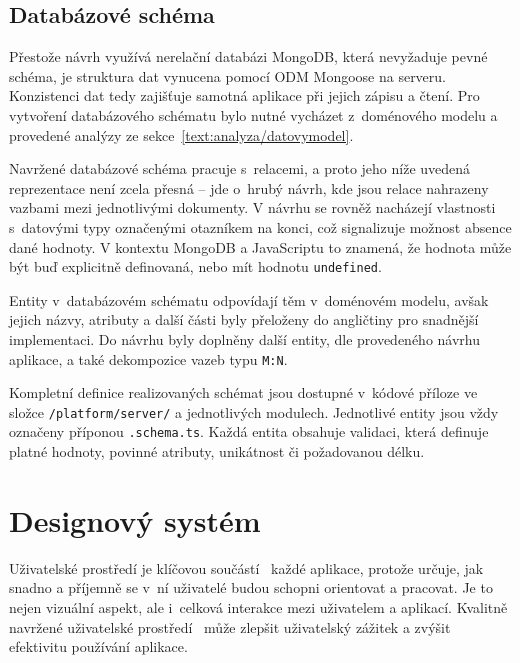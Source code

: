 \subsection{Databázové schéma}

Přestože návrh využívá nerelační databázi MongoDB, která nevyžaduje pevné schéma, je struktura dat vynucena pomocí ODM Mongoose na serveru.
Konzistenci dat tedy zajišťuje samotná aplikace při jejich zápisu a čtení. 
Pro vytvoření databázového schématu bylo nutné vycházet z~doménového modelu a provedené analýzy ze sekce~\ref{text:analyza/datovymodel}.

Navržené databázové schéma pracuje s~relacemi, a proto jeho níže uvedená reprezentace není zcela přesná -- jde o~hrubý návrh, kde jsou relace nahrazeny vazbami mezi jednotlivými dokumenty. 
V návrhu se rovněž nacházejí vlastnosti s~datovými typy označenými otazníkem na konci, což signalizuje možnost absence dané hodnoty.
V kontextu MongoDB a JavaScriptu to znamená, že hodnota může být buď explicitně definovaná, nebo mít hodnotu \texttt{undefined}.

Entity v~databázovém schématu odpovídají těm v~doménovém modelu, avšak jejich názvy, atributy a další části byly přeloženy do angličtiny pro snadnější implementaci. 
Do návrhu byly doplněny další entity, dle provedeného návrhu aplikace, a také dekompozice vazeb typu \texttt{M:N}. 

Kompletní definice realizovaných schémat jsou dostupné v~kódové příloze ve složce \verb|/platform/server/| a jednotlivých modulech.
Jednotlivé entity jsou vždy označeny příponou \verb|.schema.ts|.
Každá entita obsahuje validaci, která definuje platné hodnoty, povinné atributy, unikátnost či požadovanou délku.


\section{Designový systém}

Uživatelské prostředí je klíčovou součástí~\cite{kholmatova_2017} každé aplikace, protože určuje, jak snadno a příjemně se v~ní uživatelé budou schopni orientovat a pracovat. 
Je to nejen vizuální aspekt, ale i~celková interakce mezi uživatelem a aplikací. 
Kvalitně navržené uživatelské prostředí~\cite{tidwell_2019} může zlepšit uživatelský zážitek a zvýšit efektivitu používání aplikace.

